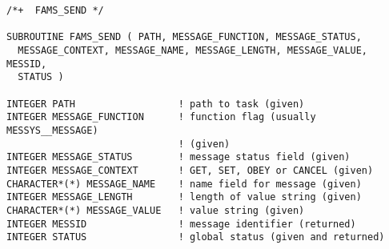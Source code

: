 \begin{verbatim}
/*+  FAMS_SEND */

SUBROUTINE FAMS_SEND ( PATH, MESSAGE_FUNCTION, MESSAGE_STATUS,
  MESSAGE_CONTEXT, MESSAGE_NAME, MESSAGE_LENGTH, MESSAGE_VALUE, MESSID,
  STATUS )

INTEGER PATH                  ! path to task (given)
INTEGER MESSAGE_FUNCTION      ! function flag (usually MESSYS__MESSAGE)
                              ! (given)
INTEGER MESSAGE_STATUS        ! message status field (given)
INTEGER MESSAGE_CONTEXT       ! GET, SET, OBEY or CANCEL (given)
CHARACTER*(*) MESSAGE_NAME    ! name field for message (given)
INTEGER MESSAGE_LENGTH        ! length of value string (given)
CHARACTER*(*) MESSAGE_VALUE   ! value string (given)
INTEGER MESSID                ! message identifier (returned)
INTEGER STATUS                ! global status (given and returned)    

\end{verbatim}



